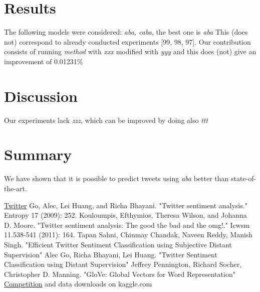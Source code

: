 \documentclass[10pt,conference,compsocconf]{IEEEtran}
\begin{document}
\section{Results}
The following models were considered: {\em aba, caba}, the best one is {\em aba} This (does not) correspond to already conducted experiments [99, 98, 97]. Our contribution consists of running {\em method} with {\em xxx} modified with {\em yyy} and this does (not) give an improvement of 0.01231\%
\section{Discussion}
Our experiments lack {\em zzz}, which can be improved by doing also {\em ttt}
\section{Summary}
We have shown that it is possible to predict tweets using {\em aba} better than state-of-the-art.

\begin{thebibliography}{99}
	 \href{http://twitter.com}{Twitter}
	 Go, Alec, Lei Huang, and Richa Bhayani. "Twitter sentiment analysis." Entropy 17 (2009): 252.
	 Kouloumpis, Efthymios, Theresa Wilson, and Johanna D. Moore. "Twitter sentiment analysis: The good the bad and the omg!." Icwsm 11.538-541 (2011): 164.
	 Tapan Sahni, Chinmay Chandak, Naveen Reddy, Manish Singh. "Efficient Twitter Sentiment Classification using Subjective Distant Supervision"
	 Alec Go, Richa Bhayani,	Lei Huang. "Twitter Sentiment Classification using Distant Supervision"
	 Jeffrey Pennington, Richard Socher, Christopher D. Manning. "GloVe: Global Vectors for Word Representation"
	 \href{https://www.kaggle.com/c/epfml17-text/data}{Competition} and data downloads on kaggle.com
\end{thebibliography}
\end{document}
